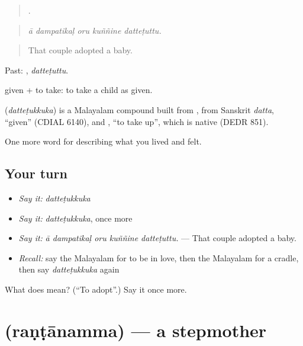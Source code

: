 \begin{quote}
    .
\end{quote}

\begin{quote}
\emph{ā dampatikaḷ oru kuññine datteṭuttu.}
\end{quote}

\begin{quote}
That couple adopted a baby.
\end{quote}

Past: , \emph{datteṭuttu}.

 given +  to take: to take a child as given.

\begin{cousinweb}
\textbf{} (\emph{datteṭukkuka}) is a Malayalam compound built from , from Sanskrit \emph{datta}, \textquotedblleft{}given\textquotedblright{} (CDIAL 6140), and , \textquotedblleft{}to take up\textquotedblright{}, which is native (DEDR 851).
\end{cousinweb}

\begin{grammarlens}[title={What you've built}]
One more word for describing what you lived and felt.
\end{grammarlens}

\subsection*{Your turn}
\begin{itemize}
\raggedright
  \item \emph{Say it:} \emph{datteṭukkuka}
  \item \emph{Say it:} \emph{datteṭukkuka}, once more
  \item \emph{Say it:} \emph{ā dampatikaḷ oru kuññine datteṭuttu.} — That couple adopted a baby.
  \item \emph{Recall:} say the Malayalam for to be in love, then the Malayalam for a cradle, then say \emph{datteṭukkuka} again
\end{itemize}

\begin{tcolorbox}[breakable,colback=teal!4,colframe=teal!35!black,title={Before you move on}]
What does  mean? (\textquotedblleft{}To adopt\textquotedblright{}.) Say it once more.
\end{tcolorbox}
\section[\texorpdfstring{\ml{രണ്ടാനമ്മ} (raṇṭānamma)}{രണ്ടാനമ്മ (raṇṭānamma)}]{ (raṇṭānamma) — a stepmother}

